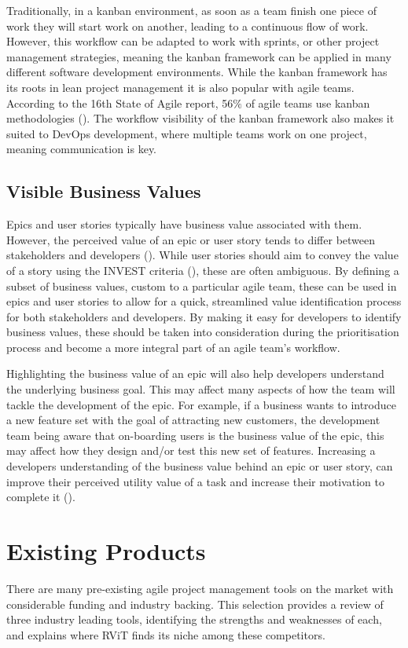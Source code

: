 \documentclass[l4proj.tex]{subfiles}
\begin{document}
Traditionally, in a kanban environment, as soon as a team finish one piece of work they will start work on another, leading to a continuous flow of work. However, this workflow can be adapted to work with sprints, or other project management strategies, meaning the kanban framework can be applied in many different software development environments. While the kanban framework has its roots in lean project management it is also popular with agile teams. According to the 16th State of Agile report, 56$\%$ of agile teams use kanban methodologies (\cite{StateOfAgile16}). The workflow visibility of the kanban framework also makes it suited to DevOps development, where multiple teams work on one project, meaning communication is key.


\subsection{Visible Business Values}

Epics and user stories typically have business value associated with them. However, the perceived value of an epic or user story tends to differ between stakeholders and developers (\cite{Gregory2020}). While user stories should aim to convey the value of a story using the INVEST criteria (\cite{Buglione2013}), these are often ambiguous. By defining a subset of business values, custom to a particular agile team, these can be used in epics and user stories to allow for a quick, streamlined value identification process for both stakeholders and developers. By making it easy for developers to identify business values, these should be taken into consideration during the prioritisation process and become a more integral part of an agile team's workflow. 

Highlighting the business value of an epic will also help developers understand the underlying business goal. This may affect many aspects of how the team will tackle the development of the epic. For example, if a business wants to introduce a new feature set with the goal of attracting new customers, the development team being aware that on-boarding users is the business value of the epic, this may affect how they design and/or test this new set of features. Increasing a developers understanding of the business value behind an epic or user story, can improve their perceived utility value of a task and increase their motivation to complete it (\cite{Wigfield2000}). 


\section{Existing Products}
There are many pre-existing agile project management tools on the market with considerable funding and industry backing. This selection provides a review of three industry leading tools, identifying the strengths and weaknesses of each, and explains where RViT finds its niche among these competitors.
\end{document}

